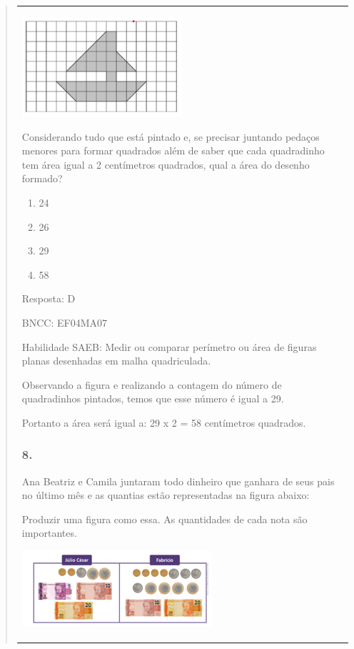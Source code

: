 \begin{enumerate}
\begin{escolha}
\begin{enumerate}
\begin{itemize}
\begin{itemize}
\begin{escolha}
\begin{quote}
\begin{escolha}
{\begin{longtable}[]{@{}l@{}}
\begin{itemize}
\includegraphics[width=2.32692in,height=1.43990in]{media/image144.png}

Considerando tudo que está pintado e, se precisar juntando pedaços
menores para formar quadrados além de saber que cada quadradinho tem
área igual a 2 centímetros quadrados, qual a área do desenho formado?

\begin{enumerate}
\def\labelenumi{\alph{enumi})}
\item
  24
\item
  26
\item
  29
\item
  58
\end{enumerate}

Resposta: D

BNCC: EF04MA07

Habilidade SAEB: Medir ou comparar perímetro ou área de figuras planas
desenhadas em malha quadriculada.

Observando a figura e realizando a contagem do número de quadradinhos
pintados, temos que esse número é igual a 29.

Portanto a área será igual a: 29 x 2 = 58 centímetros quadrados.

\subsubsection{8.}\label{section-149}

Ana Beatriz e Camila juntaram todo dinheiro que ganhara de seus pais no
último mês e as quantias estão representadas na figura abaixo:

Produzir uma figura como essa. As quantidades de cada nota são
importantes.

\includegraphics[width=2.77564in,height=1.11703in]{media/image145.png}


\end{itemize}
\end{longtable}}
\end{escolha}
\end{quote}
\end{escolha}
\end{itemize}
\end{itemize}
\end{enumerate}
\end{escolha}
\end{enumerate}
